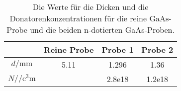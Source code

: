 \begin{table} \caption{Die Werte für die Dicken und die Donatorenkonzentrationen für die reine GaAs-Probe und die beiden n-dotierten GaAs-Proben.}
    \label{tab:proben}
    \centering
    \begin{tabular}{S[] S[] S[] S[]}
        \toprule
        {} & {Reine Probe} & {Probe 1} & {Probe 2} \\
        \midrule
         $d / \si{\milli\meter}$ & 5.11 & 1.296 & 1.36 \\
         $N / \si{\per\cubic\centi\meter}$ &  & 2.8e18 & 1.2e18 \\
        \bottomrule
    \end{tabular}
\end{table}